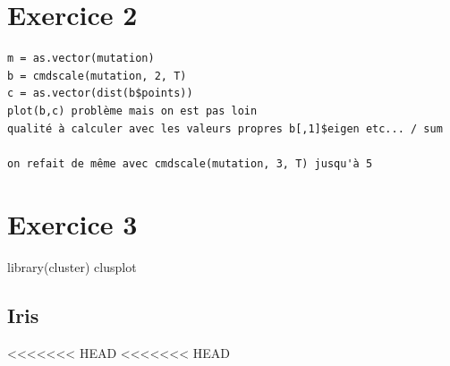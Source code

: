 \documentclass{article}\usepackage[]{graphicx}\usepackage[]{color}
\begin{document}
\section*{Exercice 2}

\begin{verbatim}
m = as.vector(mutation)
b = cmdscale(mutation, 2, T)
c = as.vector(dist(b$points))
plot(b,c) problème mais on est pas loin 
qualité à calculer avec les valeurs propres b[,1]$eigen etc... / sum 

on refait de même avec cmdscale(mutation, 3, T) jusqu'à 5 

\end{verbatim}

\section*{Exercice 3} 



library(cluster)
clusplot 
\subsection*{Iris}
<<<<<<< HEAD
<<<<<<< HEAD
\end{document}
